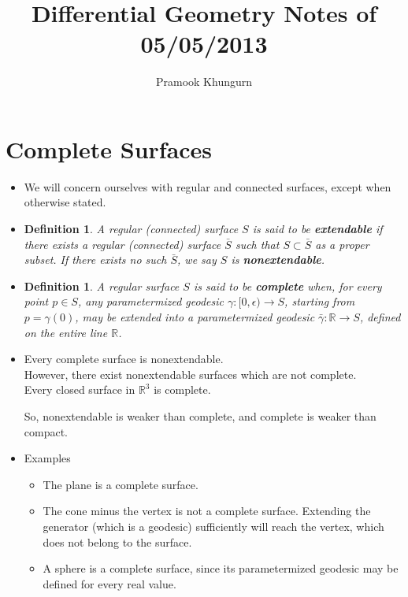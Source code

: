 \documentclass[10pt]{article}
\title{Differential Geometry Notes of 05/05/2013}
\author{Pramook Khungurn}
\newtheorem{definition}[lemma]{Definition}
\newcommand{\ra}{\rightarrow}
\newcommand{\Real}{\mathbb{R}}
\begin{document}
  \maketitle

  \section{Complete Surfaces}
  \begin{itemize}
    \item We will concern ourselves with regular and connected surfaces, except when otherwise stated.

    \item \begin{definition}
      A regular (connected) surface $S$ is said to be {\bf extendable} if there exists a regular (connected) surface $\bar S$ such that $S \subset \bar S$ as a proper subset. If there exists no such $\bar S$, we say $S$ is {\bf nonextendable}.
    \end{definition}

    \item \begin{definition}
      A regular surface $S$ is said to be {\bf complete} when, for every point $p \in S$, any parametermized geodesic $\gamma: [0,\epsilon) \ra S$, starting from $p = \gamma(0)$, may be extended into a parametermized geodesic $\bar \gamma: \Real \ra S$, defined on the entire line $\Real$.
    \end{definition}

    \item Every complete surface is nonextendable.\\
    However, there exist nonextendable surfaces which are not complete.\\
    Every closed surface in $\Real^3$ is complete.

    So, nonextendable is weaker than complete, and complete is weaker than compact.

    \item Examples
    \begin{itemize}
      \item The plane is a complete surface.

      \item The cone minus the vertex is not a complete surface. Extending the generator (which is a geodesic) sufficiently will reach the vertex, which does not belong to the surface.

      \item A sphere is a complete surface, since its parametermized geodesic may be defined for every real value.


\end{itemize}
\end{itemize}
\end{document}
